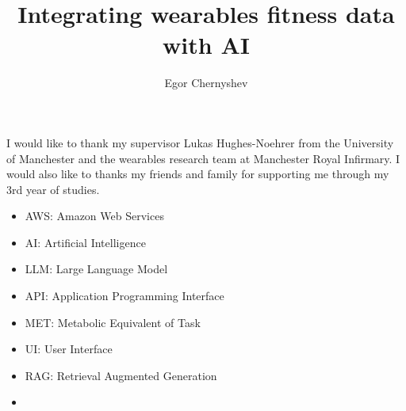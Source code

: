 \documentclass[12pt,BSc,wordcount,twoside]{muthesis}
\begin{document}

\title{Integrating wearables fitness data with AI}
\author{Egor Chernyshev}

\beforeabstract



\afterabstract

I would like to thank my supervisor Lukas Hughes-Noehrer from the University of Manchester and the 
wearables research team at Manchester Royal Infirmary. I would also like to thanks my friends and family
for supporting me through my 3rd year of studies. 

\afterpreface

\begin{itemize}
  \item AWS: Amazon Web Services
  \item AI: Artificial Intelligence
  \item LLM: Large Language Model
  \item API: Application Programming Interface
  \item MET: Metabolic Equivalent of Task
  \item UI: User Interface
  \item RAG: Retrieval Augmented Generation
  \item 
\end{itemize}













\appendix

\end{document}
